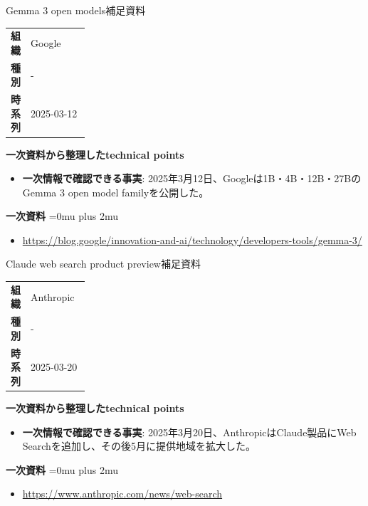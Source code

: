\begin{technicalnote}{Gemma 3 open models}{補足資料}
\begingroup
\begin{tabularx}{\linewidth}{@{}>{\bfseries}p{0.22\linewidth}X@{}}
組織 & Google \\
種別 & - \\
時系列 & 2025-03-12 \\
\end{tabularx}
\smallskip
{\bfseries 一次資料から整理したtechnical points}
\begin{itemize}[leftmargin=1.5em,itemsep=0.35em]
\item \textbf{一次情報で確認できる事実}: 2025年3月12日、Googleは1B・4B・12B・27BのGemma 3 open model familyを公開した。
\end{itemize}
\begin{samepage}
{\bfseries 一次資料}
\begingroup\sloppy
\Urlmuskip=0mu plus 2mu\relax
\begin{itemize}[leftmargin=1.5em,itemsep=0.25em]
\item {\scriptsize\url{https://blog.google/innovation-and-ai/technology/developers-tools/gemma-3/}}
\end{itemize}
\endgroup
\end{samepage}
\endgroup
\end{technicalnote}
\medskip

\begin{technicalnote}{Claude web search product preview}{補足資料}
\begingroup
\begin{tabularx}{\linewidth}{@{}>{\bfseries}p{0.22\linewidth}X@{}}
組織 & Anthropic \\
種別 & - \\
時系列 & 2025-03-20 \\
\end{tabularx}
\smallskip
{\bfseries 一次資料から整理したtechnical points}
\begin{itemize}[leftmargin=1.5em,itemsep=0.35em]
\item \textbf{一次情報で確認できる事実}: 2025年3月20日、AnthropicはClaude製品にWeb Searchを追加し、その後5月に提供地域を拡大した。
\end{itemize}
\begin{samepage}
{\bfseries 一次資料}
\begingroup\sloppy
\Urlmuskip=0mu plus 2mu\relax
\begin{itemize}[leftmargin=1.5em,itemsep=0.25em]
\item {\scriptsize\url{https://www.anthropic.com/news/web-search}}
\end{itemize}
\endgroup
\end{samepage}
\endgroup
\end{technicalnote}
\medskip

